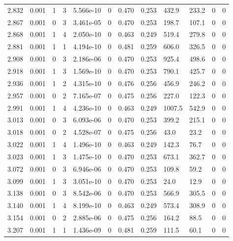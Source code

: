 \documentclass[preview]{standalone}
\begin{document}
{{{{\begin{tabular}{L{1.2cm}C{1.2cm} C{0.3cm}C{0.5cm} C{1.4cm}C{1.4cm} C{1.4cm}C{1.4cm} C{1.6cm}C{1.6cm} C{1.6cm}C{1.6cm}}
  2.832  &  0.001  & 1     &  3 &  5.566e-10  & 0  &  0.470&   0.253& 432.9 & 233.2   &  0 & 0  \\ 
  2.867  &  0.001  & 0     &  3 &  3.461e-05  & 0  &  0.470&   0.253& 198.7 & 107.1   &  0 & 0  \\ 
  2.868  &  0.001  & 1     &  4 &  2.050e-10  & 0  &  0.463&   0.249& 519.4 & 279.8   &  0 & 0  \\ 
  2.881  &  0.001  & 1     &  1 &  4.194e-10  & 0  &  0.481&   0.259& 606.0 & 326.5   &  0 & 0  \\ 
  2.908  &  0.001  & 0     &  3 &  2.186e-06  & 0  &  0.470&   0.253& 925.4 & 498.6   &  0 & 0  \\ 
  2.918  &  0.001  & 1     &  3 &  1.569e-10  & 0  &  0.470&   0.253& 790.1 & 425.7   &  0 & 0  \\ 
  2.936  &  0.001  & 1     &  2 &  4.315e-10  & 0  &  0.476&   0.256& 456.9 & 246.2   &  0 & 0  \\ 
  2.957  &  0.001  & 0     &  2 &  7.165e-07  & 0  &  0.475&   0.256& 227.0 & 122.3   &  0 & 0  \\ 
  2.991  &  0.001  & 1     &  4 &  4.236e-10  & 0  &  0.463&   0.249& 1007.5 & 542.9   &  0 & 0  \\ 
  3.013  &  0.001  & 0     &  3 &  6.093e-06  & 0  &  0.470&   0.253& 399.2 & 215.1   &  0 & 0  \\ 
  3.018  &  0.001  & 0     &  2 &  4.528e-07  & 0  &  0.475&   0.256& 43.0 & 23.2   &  0 & 0  \\ 
  3.022  &  0.001  & 1     &  4 &  1.496e-10  & 0  &  0.463&   0.249& 142.3 & 76.7   &  0 & 0  \\ 
  3.023  &  0.001  & 1     &  3 &  1.475e-10  & 0  &  0.470&   0.253& 673.1 & 362.7   &  0 & 0  \\ 
  3.072  &  0.001  & 0     &  3 &  6.946e-06  & 0  &  0.470&   0.253& 109.8 & 59.2   &  0 & 0  \\ 
  3.099  &  0.001  & 1     &  3 &  3.051e-10  & 0  &  0.470&   0.253& 24.0 & 12.9   &  0 & 0  \\ 
  3.138  &  0.001  & 0     &  3 &  8.542e-06  & 0  &  0.470&   0.253& 566.9 & 305.5   &  0 & 0  \\ 
  3.140  &  0.001  & 1     &  4 &  8.199e-10  & 0  &  0.463&   0.249& 573.4 & 308.9   &  0 & 0  \\ 
  3.154  &  0.001  & 0     &  2 &  2.885e-06  & 0  &  0.475&   0.256& 164.2 & 88.5   &  0 & 0  \\ 
  3.207  &  0.001  & 1     &  1 &  1.436e-09  & 0  &  0.481&   0.259& 111.5 & 60.1   &  0 & 0  \\ 

\end{tabular}}}}}
\end{document}
